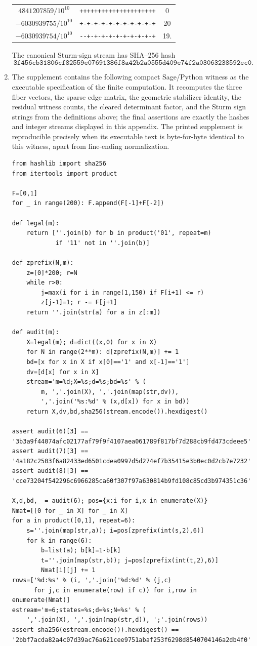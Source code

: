 \begin{proposition}
\begin{enumerate}[label=\textup{(\roman*)}]
\begin{center}
\begin{tabular}{c|c|c}
\(4841207859/10^{10}\)&\verb|+++++++++++++++++++++|&0\\
\(-6030939755/10^{10}\)&\verb|+-+-+-+-+-+-+-+-+-+-+|&20\\
\(-6030939754/10^{10}\)&\verb|--+-+-+-+-+-+-+-+-+-+|&19.
\end{tabular}
\end{center}
The canonical Sturm-sign stream has SHA--256 hash
\[
\texttt{3f456cb31806cf82559e07691386f8a42b2a0555d409e74f2a03063238592ec0}.
\]
\item The supplement contains the following compact Sage/Python witness as the executable specification of the finite computation.  It recomputes the three fiber vectors, the sparse edge matrix, the geometric stabilizer identity, the residual witness counts, the cleared determinant factor, and the Sturm sign strings from the definitions above; the final assertions are exactly the hashes and integer streams displayed in this appendix.  The printed supplement is reproducible precisely when its executable text is byte-for-byte identical to this witness, apart from line-ending normalization.
\begin{Verbatim}[breaklines=true,breakanywhere=true,fontsize=\scriptsize]
from hashlib import sha256
from itertools import product

F=[0,1]
for _ in range(200): F.append(F[-1]+F[-2])

def legal(m):
    return [''.join(b) for b in product('01', repeat=m)
            if '11' not in ''.join(b)]

def zprefix(N,m):
    z=[0]*200; r=N
    while r>0:
        j=max(i for i in range(1,150) if F[i+1] <= r)
        z[j-1]=1; r -= F[j+1]
    return ''.join(str(a) for a in z[:m])

def audit(m):
    X=legal(m); d=dict((x,0) for x in X)
    for N in range(2**m): d[zprefix(N,m)] += 1
    bd=[x for x in X if x[0]=='1' and x[-1]=='1']
    dv=[d[x] for x in X]
    stream='m=%d;X=%s;d=%s;bd=%s' % (
        m, ','.join(X), ','.join(map(str,dv)),
        ','.join('%s:%d' % (x,d[x]) for x in bd))
    return X,dv,bd,sha256(stream.encode()).hexdigest()

assert audit(6)[3] == '3b3a9f44074afc02177af79f9f4107aea061789f817bf7d288cb9fd473cdeee5'
assert audit(7)[3] == '4a182c2503f6a82433ed6501cdea0997d5d274ef7b35415e3b0ec0d2cb7e7232'
assert audit(8)[3] == 'cce73204f542296c6966285ca60f307f97a630814b9fd108c85cd3b974351c36'

X,d,bd,_ = audit(6); pos={x:i for i,x in enumerate(X)}
Nmat=[[0 for _ in X] for _ in X]
for a in product([0,1], repeat=6):
    s=''.join(map(str,a)); i=pos[zprefix(int(s,2),6)]
    for k in range(6):
        b=list(a); b[k]=1-b[k]
        t=''.join(map(str,b)); j=pos[zprefix(int(t,2),6)]
        Nmat[i][j] += 1
rows=['%d:%s' % (i, ','.join('%d:%d' % (j,c)
      for j,c in enumerate(row) if c)) for i,row in enumerate(Nmat)]
estream='m=6;states=%s;d=%s;N=%s' % (
    ','.join(X), ','.join(map(str,d)), ';'.join(rows))
assert sha256(estream.encode()).hexdigest() == '2bbf7acda82a4c07d39ac76a621cee9751abaf253f6298d8540704146a2db4f0'


\end{Verbatim}
\end{enumerate}
\end{proposition}
